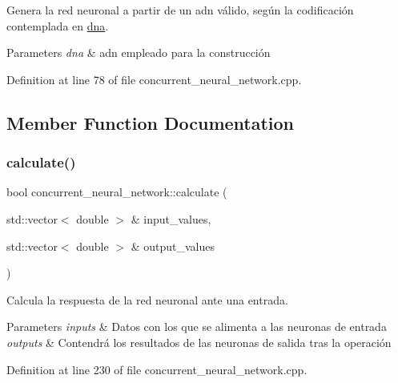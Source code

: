 Genera la red neuronal a partir de un adn válido, según la codificación contemplada en \mbox{\hyperlink{structdna}{dna}}. 


\begin{DoxyParams}{Parameters}
{\em dna} & adn empleado para la construcción \\
\hline
\end{DoxyParams}


Definition at line 78 of file concurrent\+\_\+neural\+\_\+network.\+cpp.



\subsection{Member Function Documentation}
\mbox{\label{classconcurrent__neural__network_ab3df0ad8df7bb93cc3caca1d0e28e79f}} 
\subsubsection{\texorpdfstring{calculate()}{calculate()}}
{\footnotesize\ttfamily bool concurrent\+\_\+neural\+\_\+network\+::calculate (\begin{DoxyParamCaption}\item[{std\+::vector$<$ double $>$ \&}]{input\+\_\+values,  }\item[{std\+::vector$<$ double $>$ \&}]{output\+\_\+values }\end{DoxyParamCaption})}



Calcula la respuesta de la red neuronal ante una entrada. 


\begin{DoxyParams}{Parameters}
{\em inputs} & Datos con los que se alimenta a las neuronas de entrada \\
\hline
{\em outputs} & Contendrá los resultados de las neuronas de salida tras la operación \\
\hline
\end{DoxyParams}


Definition at line 230 of file concurrent\+\_\+neural\+\_\+network.\+cpp.

\mbox{\label{classconcurrent__neural__network_a1301ba2e3c5d21633df37d1ab6ae7bb8}} 
